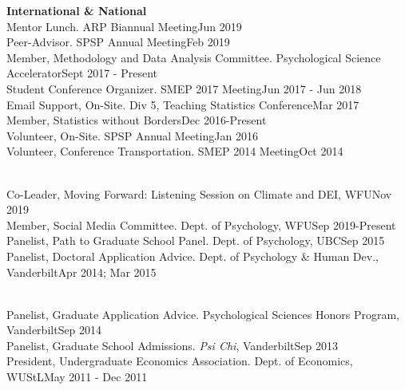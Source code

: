 {\large \textbf{International \& National}}\smallskip\\
Mentor Lunch. ARP Biannual Meeting\hfill{Jun 2019}\smallskip\\
Peer-Advisor. SPSP Annual Meeting\hfill{Feb 2019}\smallskip\\
Member, Methodology and Data Analysis Committee. Psychological Science Accelerator\hfill{Sept 2017 - Present}\smallskip\\
Student Conference Organizer. SMEP 2017 Meeting\hfill{Jun 2017 - Jun 2018}\smallskip\\
Email Support, On-Site. Div 5, Teaching Statistics Conference\hfill{Mar 2017}\smallskip\\
Member, Statistics without Borders\hfill{Dec 2016-Present}\smallskip\\
Volunteer, On-Site. SPSP Annual Meeting\hfill{Jan 2016}\smallskip\\
Volunteer, Conference Transportation. SMEP 2014 Meeting\hfill{Oct 2014}\medskip\\
%
%
\begin{minipage}{\linewidth}\smallskip\\
Co-Leader, Moving Forward: Listening Session on Climate and DEI, WFU\hfill {Nov 2019}\smallskip\\
Member, Social Media Committee. Dept. of Psychology, WFU\hfill {Sep 2019-Present}\smallskip\\
Panelist, Path to Graduate School Panel. Dept. of Psychology, UBC\hfill {Sep 2015}\smallskip\\
Panelist, Doctoral Application Advice. Dept. of Psychology \& Human Dev., Vanderbilt\hfill {Apr 2014; Mar 2015}\vspace{1.1mm}\end{minipage}\smallskip\\
Panelist, Graduate Application Advice. Psychological Sciences Honors Program, Vanderbilt\hfill {Sep 2014}\smallskip\\
Panelist, Graduate School Admissions. \textit{Psi Chi}, Vanderbilt\hfill {Sep 2013}\smallskip\\
President, Undergraduate Economics Association. Dept. of Economics, WUStL\hfill  {May 2011 - Dec 2011}\smallskip\\
